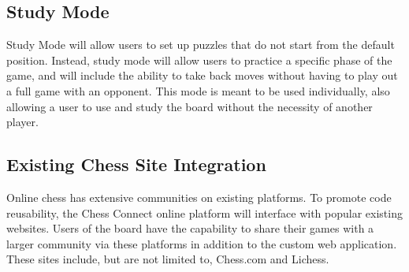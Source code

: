\documentclass{article}
\begin{document}
\subsection{Study Mode}
{Study Mode will allow users to set up puzzles that do not start from the default position. Instead, study mode will allow users to practice a specific phase of the game, and will include the ability to take back moves without having to play out a full game with an opponent. This mode is meant to be used individually, also allowing a user to use and study the board without the necessity of another player.}

\subsection{Existing Chess Site Integration}
{Online chess has extensive communities on existing platforms. To promote code reusability, the Chess Connect online platform will interface with popular existing websites.
Users of the board have the capability to share their games with a larger community via these platforms in addition to the custom web application. These sites include, but are not limited to, Chess.com and Lichess.}
\end{document}

